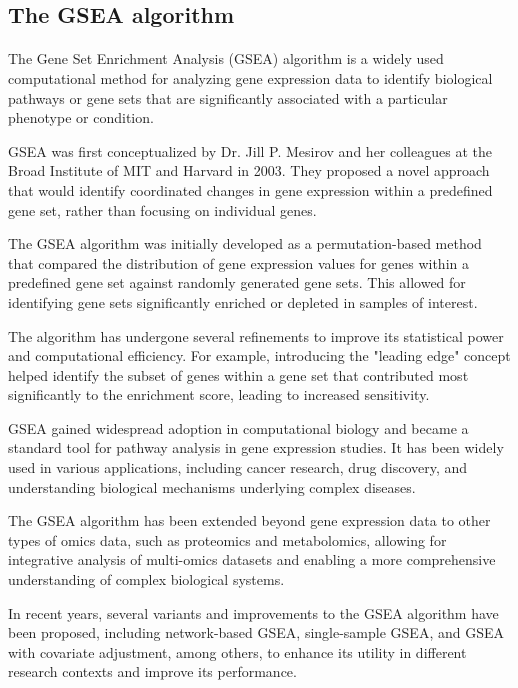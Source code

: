 \documentclass[12pt]{extarticle}
\begin{document}
\subsection{The GSEA algorithm}

\paragraph{} The Gene Set Enrichment Analysis (GSEA) algorithm is a widely used computational method for analyzing gene expression data to identify biological pathways or gene sets that are significantly associated with a particular phenotype or condition.

GSEA was first conceptualized by Dr. Jill P. Mesirov and her colleagues at the Broad Institute of MIT and Harvard in 2003. They proposed a novel approach that would identify coordinated changes in gene expression within a predefined gene set, rather than focusing on individual genes.

The GSEA algorithm was initially developed as a permutation-based method that compared the distribution of gene expression values for genes within a predefined gene set against randomly generated gene sets. This allowed for identifying gene sets significantly enriched or depleted in samples of interest.

The algorithm has undergone several refinements to improve its statistical power and computational efficiency. For example, introducing the "leading edge" concept helped identify the subset of genes within a gene set that contributed most significantly to the enrichment score, leading to increased sensitivity.

GSEA gained widespread adoption in computational biology and became a standard tool for pathway analysis in gene expression studies. It has been widely used in various applications, including cancer research, drug discovery, and understanding biological mechanisms underlying complex diseases.

The GSEA algorithm has been extended beyond gene expression data to other types of omics data, such as proteomics and metabolomics, allowing for integrative analysis of multi-omics datasets and enabling a more comprehensive understanding of complex biological systems.

In recent years, several variants and improvements to the GSEA algorithm have been proposed, including network-based GSEA, single-sample GSEA, and GSEA with covariate adjustment, among others, to enhance its utility in different research contexts and improve its performance.
\end{document}
